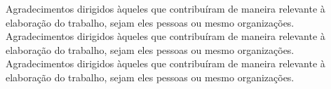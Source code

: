 Agradecimentos dirigidos àqueles que contribuíram de maneira relevante à elaboração do trabalho, sejam eles pessoas ou mesmo organizações.
\newline
\newline
Agradecimentos dirigidos àqueles que contribuíram de maneira relevante à elaboração do trabalho, sejam eles pessoas ou mesmo organizações.
\newline
\newline
Agradecimentos dirigidos àqueles que contribuíram de maneira relevante à elaboração do trabalho, sejam eles pessoas ou mesmo organizações.